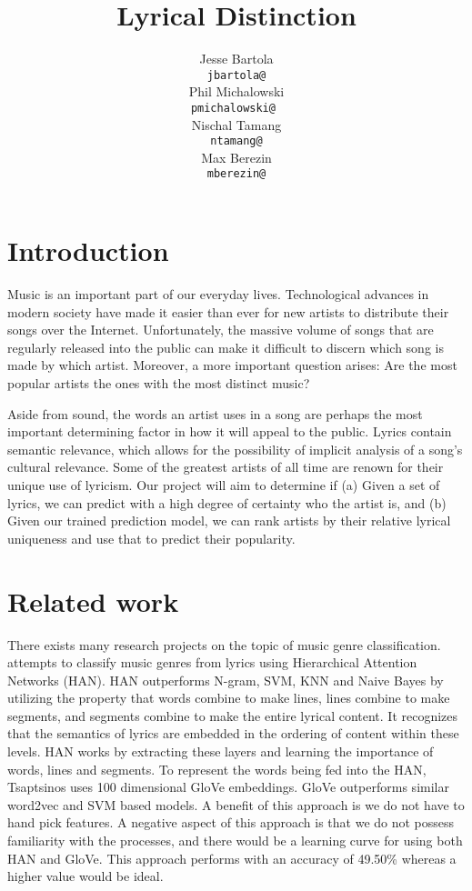 \documentclass[11pt,a4paper]{article}
\title{Lyrical Distinction}
\author{Jesse Bartola \\
  {\tt jbartola@} \\\And
  Phil Michalowski \\
  {\tt pmichalowski@ } \\\And
  Nischal Tamang \\
  {\tt ntamang@} \\\And
  Max Berezin \\
  {\tt mberezin@} \\}
\date{}
\begin{document}
\maketitle

\section{Introduction}
Music is an important part of our everyday lives. Technological advances in modern society have made it easier than ever for new artists to distribute their songs over the Internet. Unfortunately, the massive volume of songs that are regularly released into the public can make it difficult to discern which song is made by which artist. Moreover, a more important question arises: Are the most popular artists the ones with the most distinct music?

Aside from sound, the words an artist uses in a song are perhaps the most important determining factor in how it will appeal to the public. 
Lyrics contain semantic relevance, which allows for the possibility of implicit analysis of a song's cultural relevance. 
Some of the greatest artists of all time are renown for their unique use of lyricism. Our project will aim to determine if (a) Given a set of lyrics, we can predict with a high degree of certainty who the artist is, and (b) Given our trained prediction model, we can rank artists by their relative lyrical uniqueness and use that to predict their popularity.


\section{Related work}
There exists many research projects on the topic of music genre classification.  attempts to classify music genres from lyrics using Hierarchical Attention Networks (HAN). 
HAN outperforms N-gram, SVM, KNN and Naive Bayes by utilizing the property that words combine to make lines, lines combine to make segments, and segments combine to make the entire lyrical content.
It recognizes that the semantics of lyrics are embedded in the ordering of content within these levels. 
HAN works by extracting these layers and learning the importance of words, lines and segments. 
To represent the words being fed into the HAN, Tsaptsinos uses 100 dimensional GloVe embeddings. 
GloVe outperforms similar word2vec and SVM based models. 
A benefit of this approach is we do not have to hand pick features.
A negative aspect of this approach is that we do not possess familiarity with the processes, and there would be a learning curve for using both HAN and GloVe. 
This approach performs with an accuracy of 49.50\% whereas a higher value would be ideal. 
\end{document}
